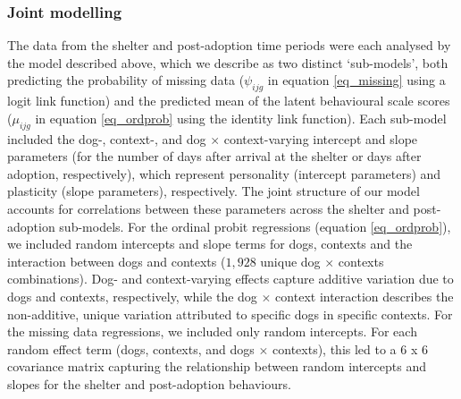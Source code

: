 \documentclass[fleqn,10pt]{wlscirep}
\begin{document}
\subsubsection*{Joint modelling}
The data from the shelter and post-adoption time periods were each analysed by the model described above, which we describe as two distinct `sub-models', both predicting the probability of missing data ($\psi_{ijg}$ in equation \ref{eq_missing} using a logit link function) and the predicted mean of the latent behavioural scale scores ($\mu_{ijg}$ in equation \ref{eq_ordprob} using the identity link function). Each sub-model included the dog-, context-, and dog $\times$ context-varying intercept and slope parameters (for the number of days after arrival at the shelter or days after adoption, respectively), which represent personality (intercept parameters) and plasticity (slope parameters), respectively.  The joint structure of our model accounts for correlations between these parameters across the shelter and post-adoption sub-models. For the ordinal probit regressions (equation \ref{eq_ordprob}), we included random intercepts and slope terms for dogs, contexts and the interaction between dogs and contexts ($1,928$ unique dog $\times$ contexts combinations). Dog- and context-varying effects capture additive variation due to dogs and contexts, respectively, while the dog $\times$ context interaction describes the non-additive, unique variation attributed to specific dogs in specific contexts. For the missing data regressions, we included only random intercepts. For each random effect term (dogs, contexts, and dogs $\times$ contexts), this led to a 6 x 6 covariance matrix capturing the relationship between random intercepts and slopes for the shelter and post-adoption behaviours.
\end{document}
